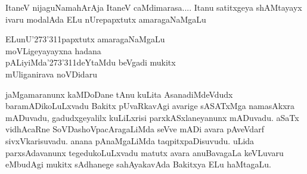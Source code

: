 \begin{entry}
\smallskip
\begin{shl}
ItaneV nijaguNamahArAja ItaneV caMdimarasa.... Itanu satitxgeya
shAMtayayx ivaru modalAda ELu nUrepapxtutx amaragaNaMgaLu 
\end{shl}
\medskip
{}
\smallskip
\begin{shl}
ELunU\char'273\char'311papxtutx amaragaNaMgaLu\\
moVLigeyayayxna hadana\\
pALiyiMda\char'273\char'311deYtaMdu beVgadi mukitx\\
mUliganirava noVDidaru
\end{shl}
\medskip
{}
\end{entry}

\begin{entry}

\smallskip
\begin{shl}
jaMgamaranunx kaMDoDane tAnu kuLita AsanadiMdeVdudx baramADikoLuLxvadu
Bakitx pUvaRkavAgi avarige sASATxMga namasAkxra mADuvadu,
gadudxgeyalilx kuLiLxrisi parxkASxlaneyanunx mADuvadu. aSaTx
vidhAcaRne SoVDashoVpacAragaLiMda seVve mADi avara pAveVdarf
sivxVkarisuvadu. anana pAnaMgaLiMda taqpitxpaDisuvudu. uLida
parxsAdavanunx tegedukoLuLxvadu matutx avara anuBavagaLa keVLuvaru
eMbudAgi mukitx sAdhanege sahAyakavAda Bakitxya ELu haMtagaLu. 
\end{shl}
\medskip
{}
\end{entry}

\begin{entry}
\end{entry}

